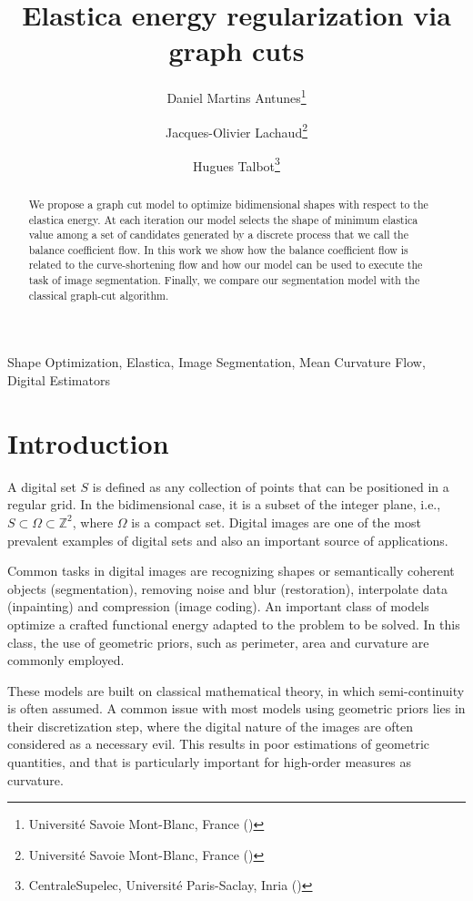 \documentclass[review]{siamart220329}
\title{Elastica energy regularization via graph cuts}
\author{Daniel Martins Antunes\thanks{Universit\'e Savoie Mont-Blanc, France (\email{danoan2008@gmail.com})}
\and Jacques-Olivier Lachaud\thanks{Universit\'e Savoie Mont-Blanc, France (\email{jacques-olivier.lachaud@univ-smb.fr})}
\and Hugues Talbot\thanks{CentraleSupelec, Universit\'e Paris-Saclay, Inria (\email{hugues.talbot@centralesupelec.fr})}}
\begin{document}
\maketitle

\begin{abstract}
We propose a graph cut model to optimize bidimensional shapes with respect to the elastica energy. At each iteration our model
selects the shape of minimum elastica value among a set of candidates generated by a discrete process that we call the balance 
coefficient flow. In this work we show how the balance coefficient flow is related to the curve-shortening flow and how our
model can be used to execute the task of image segmentation. Finally, we compare our segmentation model with the classical graph-cut algorithm. 
\end{abstract}

\begin{keywords}
Shape Optimization, Elastica, Image Segmentation, Mean Curvature Flow, Digital Estimators
\end{keywords}

\section{Introduction}

A digital set $S$ is defined as any collection of points that can be positioned in a regular grid. In the bidimensional case, it is a subset of the integer plane, i.e., $S \subset \Omega \subset \mathbb{Z}^2$, where $\Omega$ is a compact set. Digital images are one of the most prevalent examples of digital sets and also an important source of applications.

Common tasks in digital images are recognizing shapes or semantically coherent objects (segmentation), removing noise and blur (restoration), interpolate data (inpainting) and compression (image coding). An important class of models optimize a crafted functional energy adapted to the problem to be solved. In this class, the use of geometric priors, such as perimeter, area and curvature are commonly employed.

These models are built on classical mathematical theory, in which semi-continuity is often assumed. A common issue with most models using geometric priors lies in their discretization step, where the digital nature of the images are often considered as a necessary evil. This results in poor estimations of geometric quantities, and that is particularly important for high-order measures as curvature.
\end{document}
